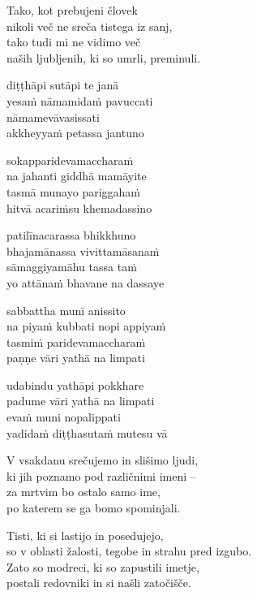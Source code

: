 Tako, kot prebujeni človek\\
nikoli več ne sreča tistega iz sanj,\\
tako tudi mi ne vidimo več\\
naših ljubljenih, ki so umrli, preminuli.


\clearpage

diṭṭhāpi sutāpi te janā\\
yesaṁ nāmamidaṁ pavuccati\\
nāmamevāvasissati\\
akkheyyaṁ petassa jantuno

sokapparidevamaccharaṁ\\
na jahanti giddhā mamāyite\\
tasmā munayo pariggahaṁ\\
hitvā acariṁsu khemadassino

patilīnacarassa bhikkhuno\\
bhajamānassa vivittamāsanaṁ\\
sāmaggiyamāhu tassa taṁ\\
yo attānaṁ bhavane na dassaye

sabbattha munī anissito\\
na piyaṁ kubbati nopi appiyaṁ\\
tasmiṁ paridevamaccharaṁ\\
paṇṇe vāri yathā na limpati

udabindu yathāpi pokkhare\\
padume vāri yathā na limpati\\
evaṁ muni nopalippati\\
yadidaṁ diṭṭhasutaṁ mutesu vā


\clearpage

V vsakdanu srečujemo in slišimo ljudi,\\
ki jih poznamo pod različnimi imeni --\\
za mrtvim bo ostalo samo ime,\\
po katerem se ga bomo spominjali.

Tisti, ki si lastijo in posedujejo,\\
so v oblasti žalosti, tegobe in strahu pred izgubo.\\
Zato so modreci, ki so zapustili imetje,\\
postali redovniki in si našli zatočišče.

